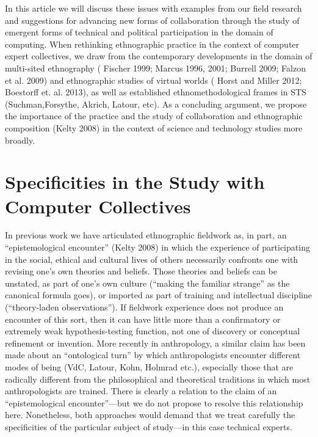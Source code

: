 \documentclass[10pt,letter,oneside]{scrartcl}
\begin{document}
In this article we will discuss these issues with examples from our
field research and suggestions for advancing new forms of
collaboration through the study of emergent forms of technical and
political participation in the domain of computing.  When rethinking
ethnographic practice in the context of computer expert collectives,
we draw from the contemporary developments in the domain of
multi-sited ethnography (\cite{Fischer1999,Marcus1995,Burrell2009}
Fischer 1999; Marcus 1996, 2001; Burrell 2009; Falzon et al. 2009) and 
ethnographic studies of virtual worlds (\cite{BOELLSTORFF2008,Miller2001} 
Horst and Miller 2012; Boestorff et. al. 2013), as well as established 
ethnomethodological frames in STS (Suchman,Forsythe, Akrich, Latour, etc).
As a concluding argument, we propose the importance of the practice and the 
study of collaboration and ethnographic composition (Kelty 2008) in the 
context of science and technology studies more broadly.

\section{Specificities in the Study with Computer Collectives}

In previous work we have articulated ethnographic fieldwork as, in
part, an ``epistemological encounter'' (Kelty 2008) in which the
experience of participating in the social, ethical and cultural lives
of others necessarily confronts one with revising one's own theories
and beliefs.  Those theories and beliefs can be unstated, as part of
one's own culture (``making the familiar strange'' as the canonical
formula goes), or imported as part of training and intellectual discipline 
(``theory-laden observations'').  If fieldwork experience does not produce 
an encounter of this sort, then it can have little more than a
confirmatory or extremely weak hypothesis-testing function, not one of
discovery or conceptual refinement or invention.  More recently in
anthropology, a similar claim has been made about an ``ontological
turn'' by which anthropologists encounter different modes of being
(VdC, Latour, Kohn, Holmrad etc.), especially those that are radically
different from the philosophical and theoretical traditions in which
most anthropologists are trained.  There is clearly a relation to the
claim of an ``epistemological encounter''---but we do not propose to
resolve this relationship here.  Nonetheless, both approaches would
demand that we treat carefully the specificities of the particular
subject of study---in this case technical experts.
\end{document}
